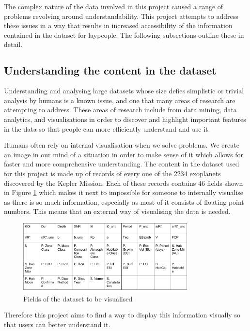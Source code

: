 The complex nature of the data involved in this project caused a range of
problems revolving around understandability. This project
attempts to address these issues in a way that results in increased
accessibility of the information contained in the dataset for laypeople. The
following subsections outline these in detail.

\subsection{Understanding the content in the dataset}
Understanding and analysing large datasets whose size defies simplistic or
trivial analysis by humans is a known issue, and one that many areas of research
are
attempting to address. These areas of research include from data mining, data
analytics, and visualisations in order to discover and highlight important
features in the data so that people can more efficiently understand and use it. 

Humans often rely on internal visualisation when we solve problems. We create an
image in our mind of a situation in order to make sense of it
\cite{visualisingpiggott} which allows for faster and more comprehensive
understanding. The content in the dataset used
for this project is made up of records of every one of the 2234 exoplanets
discovered by the Kepler Mission. Each of these records contains 46 fields shown
in Figure \ref{fig:fields} which
makes it next to impossible for someone to internally visualise as there is so
much information, especially as most of it consists of floating point numbers.
This means that an external
way of visualising the data is needed.
\begin{figure}[H]
  \centering
      \includegraphics[width=0.8\textwidth]{images/data.png}
  \caption{Fields of the dataset to be visualised}
  \label{fig:fields}
\end{figure}
 Therefore this project aims to find a way to display this information visually
so that users can better understand it.
